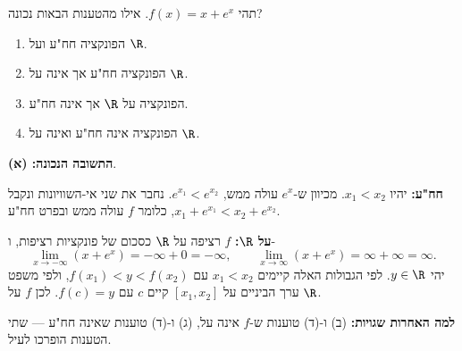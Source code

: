 
\begin{question}
תהי $f(x)=x+e^x$. אילו מהטענות הבאות נכונה?
\begin{enumerate}
  \item הפונקציה חח"ע ועל $\R$.
  \item הפונקציה חח"ע אך אינה על $\R$.
  \item הפונקציה על $\R$ אך אינה חח"ע.
  \item הפונקציה אינה חח"ע ואינה על $\R$.
\end{enumerate}
\end{question}

\begin{solution}
\textbf{התשובה הנכונה: (א)}.

\textbf{חח"ע:} יהיו $x_1<x_2$. מכיוון ש-$e^x$ עולה ממש, $e^{x_1}<e^{x_2}$. נחבר את שני אי-השוויונות ונקבל $x_1+e^{x_1}<x_2+e^{x_2}$, כלומר $f$ עולה ממש ובפרט חח"ע.

\textbf{על $\R$:} $f$ רציפה על $\R$ כסכום של פונקציות רציפות, ו-
\[
\lim_{x\to-\infty}(x+e^x)=-\infty+0=-\infty,\qquad \lim_{x\to\infty}(x+e^x)=\infty+\infty=\infty .
\]
יהי $y\in\R$. לפי הגבולות האלה קיימים $x_1<x_2$ עם $f(x_1)<y<f(x_2)$, ולפי משפט ערך הביניים על $[x_1,x_2]$ קיים $c$ עם $f(c)=y$. לכן $f$ על $\R$.

\textbf{למה האחרות שגויות:} (ב) ו-(ד) טוענות ש-$f$ אינה על, (ג) ו-(ד) טוענות שאינה חח"ע — שתי הטענות הופרכו לעיל.
\end{solution}
